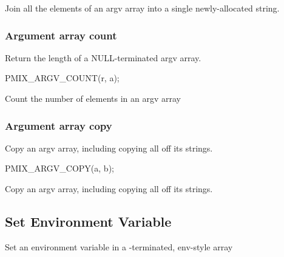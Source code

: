 Join all the elements of an argv array into a single newly-allocated string.

\subsubsection{Argument array count}

\summary

Return the length of a NULL-terminated argv array.

\cspecificstart
\begin{codepar}
PMIX_ARGV_COUNT(r, a);
\end{codepar}
\cspecificend

\begin{arglist}
\end{arglist}

\descr

Count the number of elements in an argv array


\subsubsection{Argument array copy}

\summary

Copy an argv array, including copying all off its strings.

\cspecificstart
\begin{codepar}
PMIX_ARGV_COPY(a, b);
\end{codepar}
\cspecificend

\begin{arglist}
\end{arglist}

\descr

Copy an argv array, including copying all off its strings.


\subsection{Set Environment Variable}

\summary

Set an environment variable in a -terminated, env-style array

